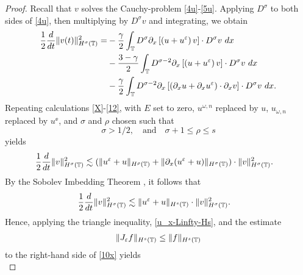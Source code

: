 %
%
%
\begin{proof}
Recall that $v$ solves the Cauchy-problem \eqref{4u}-\eqref{5u}.
Applying $D^\sigma$ to both sides of \eqref{4u}, then multiplying by
$D^\sigma v$ and integrating, we obtain 
%
%
\begin{equation*}
\begin{split}
\frac{1}{2}\frac{d}{dt}\|v(t)\|_{H^\sigma(\mathbb{T})}^2
= & - \frac{\gamma}{2}\int_{\mathbb{T}} D^\sigma
\partial_x \left[ \left( u + u^\varepsilon \right)v
\right]\cdot D^\sigma v \ dx
\\
& - \frac{3-\gamma}{2}\int_{\mathbb{T}} D^{\sigma
-2} \partial_x \left[ \left( u + u^\varepsilon
\right)v \right] \cdot D^\sigma v \ dx
\\
& - \frac{\gamma}{2}\int_{\mathbb{T}} D^{\sigma
-2}
\partial_x \left[ \left( \partial_x u + \partial_x u^\varepsilon
\right)\cdot \partial_x v \right] \cdot
D^\sigma v \ dx.
\end{split}
\end{equation*}
%
%
Repeating calculations \eqref{X}-\eqref{12}, with $E$ set to zero,
$u^{\omega,n}$ replaced by $u$, $u_{\omega,n}$ replaced by $u^\ee$, and
$\sigma$ and $\rho$ chosen such that
%
%
%
\begin{equation*}
\label{size_of_sigma}
 \sigma > 1/2,
 \quad 
 \text{and}
 \quad
 \sigma + 1 \le \rho \le s 
\end{equation*}
%
%
yields
%
%
\begin{equation*}
\begin{split}
\frac{1}{2}\frac{d}{dt} \|v\|_{H^\sigma(\mathbb{T})}^2
& \lesssim
(\|u^{\varepsilon} + u\|_{H^{\rho}(\mathbb{T})} +
\|\partial_x(u^{\varepsilon} + u) \|_{H^\sigma(\mathbb{T})})
\cdot \|v\|_{H^\sigma(\mathbb{T})}^2.
\end{split}
\end{equation*}
%
%
By the Sobolev Imbedding Theorem , it follows that 
%
%
\begin{equation}
\begin{split}
\frac{1}{2}\frac{d}{dt} \|v\|_{H^{\sigma}(\mathbb{T})}^2
& \lesssim
\|u^{\varepsilon}
+ u\|_{H^{s}(\mathbb{T})} \cdot \|v\|_{H^{\sigma}(\mathbb{T})}^2.
\label{10x}
\end{split}
\end{equation}
%
%
Hence, applying the triangle inequality, \eqref{u_x-Linfty-Hs}, and the estimate
%
%
\begin{equation}
\begin{split}
	\|J_\varepsilon f\|_{H^s(\mathbb{T})} \le \|f\|_{H^s(\mathbb{T})}
\label{lem100u}
\end{split}
\end{equation}
%
%
%
%
to the right-hand side of \eqref{10x} yields
%
%
%
%
%
\begin{equation*}

\end{equation*}
\end{proof}
